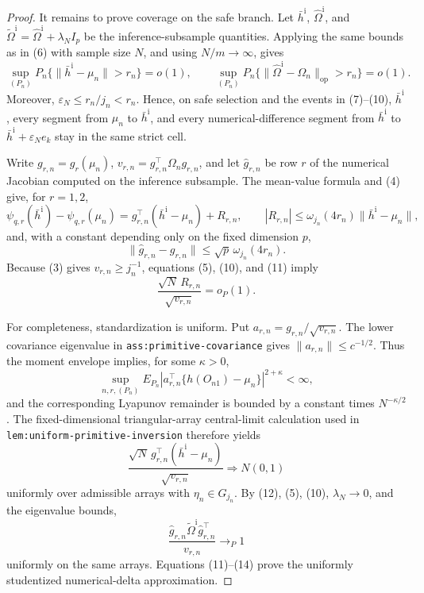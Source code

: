 \documentclass{article}
\begin{document}
\begin{proof}
It remains to prove coverage on the safe branch.  Let \(\bar h^{\mathrm i}\), \(\widehat\Omega^{\mathrm i}\), and \(\widetilde\Omega^{\mathrm i}=\widehat\Omega^{\mathrm i}+\lambda_NI_p\) be the inference-subsample quantities.  Applying the same bounds as in (6) with sample size \(N\), and using \(N/m\to\infty\), gives
\[
 \sup_{(P_n)}P_n\{\|\bar h^{\mathrm i}-\mu_n\|>r_n\}=o(1),
 \qquad
 \sup_{(P_n)}P_n\{\|\widehat\Omega^{\mathrm i}-\Omega_n\|_{\mathrm{op}}>r_n\}=o(1). \tag{10}
\]
Moreover, \(\varepsilon_N\le r_n/j_n<r_n\).  Hence, on safe selection and the events in (7)--(10), \(\bar h^{\mathrm i}\), every segment from \(\mu_n\) to \(\bar h^{\mathrm i}\), and every numerical-difference segment from \(\bar h^{\mathrm i}\) to \(\bar h^{\mathrm i}+\varepsilon_Ne_k\) stay in the same strict cell.

Write \(g_{r,n}=g_r(\mu_n)\), \(v_{r,n}=g_{r,n}^\top\Omega_ng_{r,n}\), and let \(\widehat g_{r,n}\) be row \(r\) of the numerical Jacobian computed on the inference subsample.  The mean-value formula and (4) give, for \(r=1,2\),
\[
 \psi_{q,r}(\bar h^{\mathrm i})-\psi_{q,r}(\mu_n)
 =g_{r,n}^\top(\bar h^{\mathrm i}-\mu_n)+R_{r,n},
 \qquad
 |R_{r,n}|\le \omega_{j_n}(4r_n)\|\bar h^{\mathrm i}-\mu_n\|, \tag{11}
\]
and, with a constant depending only on the fixed dimension \(p\),
\[
 \|\widehat g_{r,n}-g_{r,n}\|
 \le \sqrt p\,\omega_{j_n}(4r_n). \tag{12}
\]
Because (3) gives \(v_{r,n}\ge j_n^{-1}\), equations (5), (10), and (11) imply
\[
 \frac{\sqrt N\,R_{r,n}}{\sqrt{v_{r,n}}}=o_P(1). \tag{13}
\]

For completeness, standardization is uniform.  Put \(a_{r,n}=g_{r,n}/\sqrt{v_{r,n}}\).  The lower covariance eigenvalue in \texttt{ass:primitive-covariance} gives \(\|a_{r,n}\|\le c^{-1/2}\).  Thus the moment envelope implies, for some \(\kappa>0\),
\[
 \sup_{n,r,(P_n)}E_{P_n}|a_{r,n}^\top\{h(O_{n1})-\mu_n\}|^{2+\kappa}<\infty,
\]
and the corresponding Lyapunov remainder is bounded by a constant times \(N^{-\kappa/2}\).  The fixed-dimensional triangular-array central-limit calculation used in \texttt{lem:uniform-primitive-inversion} therefore yields
\[
 \frac{\sqrt N\,g_{r,n}^\top(\bar h^{\mathrm i}-\mu_n)}{\sqrt{v_{r,n}}}
 \Rightarrow N(0,1)
\]
uniformly over admissible arrays with \(\eta_n\in G_{j_n}\).  By (12), (5), (10), \(\lambda_N\to0\), and the eigenvalue bounds,
\[
 \frac{\widehat g_{r,n}\widetilde\Omega^{\mathrm i}\widehat g_{r,n}^\top}{v_{r,n}}
 \to_P1 \tag{14}
\]
uniformly on the same arrays.  Equations (11)--(14) prove the uniformly studentized numerical-delta approximation.


\end{proof}
\end{document}
